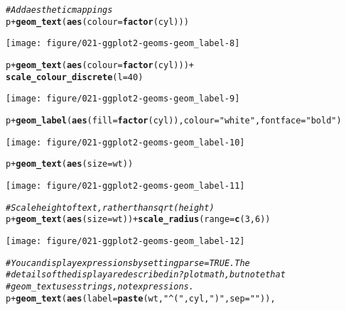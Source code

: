 \documentclass[a4paper,titlepage]{tufte-handout}\usepackage[]{graphicx}\usepackage[]{color}
\makeatletter
\def\maxwidth{ %
  \ifdim\Gin@nat@width>\linewidth
    \linewidth
  \else
    \Gin@nat@width
  \fi
}
\newcommand{\hlnum}[1]{\textcolor[rgb]{0.686,0.059,0.569}{#1}}%
\newcommand{\hlstr}[1]{\textcolor[rgb]{0.192,0.494,0.8}{#1}}%
\newcommand{\hlcom}[1]{\textcolor[rgb]{0.678,0.584,0.686}{\textit{#1}}}%
\newcommand{\hlopt}[1]{\textcolor[rgb]{0,0,0}{#1}}%
\newcommand{\hlstd}[1]{\textcolor[rgb]{0.345,0.345,0.345}{#1}}%
\newcommand{\hlkwc}[1]{\textcolor[rgb]{0.333,0.667,0.333}{#1}}%
\newcommand{\hlkwd}[1]{\textcolor[rgb]{0.737,0.353,0.396}{\textbf{#1}}}%
\newenvironment{kframe}{%
 \def\at@end@of@kframe{}%
 \ifinner\ifhmode%
  \def\at@end@of@kframe{\end{minipage}}%
  \begin{minipage}{\columnwidth}%
 \fi\fi%
 \def\FrameCommand##1{\hskip\@totalleftmargin \hskip-\fboxsep
 \colorbox{shadecolor}{##1}\hskip-\fboxsep
     \hskip-\linewidth \hskip-\@totalleftmargin \hskip\columnwidth}%
 \MakeFramed {\advance\hsize-\width
   \@totalleftmargin\z@ \linewidth\hsize
   \@setminipage}}%
 {\par\unskip\endMakeFramed%
 \at@end@of@kframe}
\newenvironment{knitrout}{}{} %
\makeatother
\begin{document}
\begin{knitrout}
\begin{kframe}
\begin{alltt}
\hlcom{# Add aesthetic mappings}
\hlstd{p} \hlopt{+} \hlkwd{geom_text}\hlstd{(}\hlkwd{aes}\hlstd{(}\hlkwc{colour} \hlstd{=} \hlkwd{factor}\hlstd{(cyl)))}
\end{alltt}
\end{kframe}
\texttt{[image: figure/021-ggplot2-geoms-geom\_label-8]} 
\begin{kframe}\begin{alltt}
\hlstd{p} \hlopt{+} \hlkwd{geom_text}\hlstd{(}\hlkwd{aes}\hlstd{(}\hlkwc{colour} \hlstd{=} \hlkwd{factor}\hlstd{(cyl)))} \hlopt{+}
  \hlkwd{scale_colour_discrete}\hlstd{(}\hlkwc{l} \hlstd{=} \hlnum{40}\hlstd{)}
\end{alltt}
\end{kframe}
\texttt{[image: figure/021-ggplot2-geoms-geom\_label-9]} 
\begin{kframe}\begin{alltt}
\hlstd{p} \hlopt{+} \hlkwd{geom_label}\hlstd{(}\hlkwd{aes}\hlstd{(}\hlkwc{fill} \hlstd{=} \hlkwd{factor}\hlstd{(cyl)),} \hlkwc{colour} \hlstd{=} \hlstr{"white"}\hlstd{,} \hlkwc{fontface} \hlstd{=} \hlstr{"bold"}\hlstd{)}
\end{alltt}
\end{kframe}
\texttt{[image: figure/021-ggplot2-geoms-geom\_label-10]} 
\begin{kframe}\begin{alltt}
\hlstd{p} \hlopt{+} \hlkwd{geom_text}\hlstd{(}\hlkwd{aes}\hlstd{(}\hlkwc{size} \hlstd{= wt))}
\end{alltt}
\end{kframe}
\texttt{[image: figure/021-ggplot2-geoms-geom\_label-11]} 
\begin{kframe}\begin{alltt}
\hlcom{# Scale height of text, rather than sqrt(height)}
\hlstd{p} \hlopt{+} \hlkwd{geom_text}\hlstd{(}\hlkwd{aes}\hlstd{(}\hlkwc{size} \hlstd{= wt))} \hlopt{+} \hlkwd{scale_radius}\hlstd{(}\hlkwc{range} \hlstd{=} \hlkwd{c}\hlstd{(}\hlnum{3}\hlstd{,}\hlnum{6}\hlstd{))}
\end{alltt}
\end{kframe}
\texttt{[image: figure/021-ggplot2-geoms-geom\_label-12]} 
\begin{kframe}\begin{alltt}
\hlcom{# You can display expressions by setting parse = TRUE.  The}
\hlcom{# details of the display are described in ?plotmath, but note that}
\hlcom{# geom_text uses strings, not expressions.}
\hlstd{p} \hlopt{+} \hlkwd{geom_text}\hlstd{(}\hlkwd{aes}\hlstd{(}\hlkwc{label} \hlstd{=} \hlkwd{paste}\hlstd{(wt,} \hlstr{"^("}\hlstd{, cyl,} \hlstr{")"}\hlstd{,} \hlkwc{sep} \hlstd{=} \hlstr{""}\hlstd{)),}

\end{alltt}
\end{kframe}
\end{knitrout}
\end{document}
